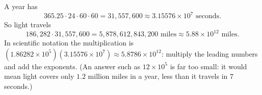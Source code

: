 A year has
\[
365.25\cdot24\cdot60\cdot60=31{,}557{,}600\approx3.15576\times10^{7}\text{ seconds}.
\]
So light travels
\[
186{,}282\cdot31{,}557{,}600=5{,}878{,}612{,}843{,}200\text{ miles}\approx\boxed{5.88\times10^{12}\text{ miles}}.
\]
In scientific notation the multiplication is $(1.86282\times10^5)(3.15576\times10^7)\approx5.8786\times10^{12}$: multiply the leading numbers and add the exponents. (An answer such as $12\times10^5$ is far too small: it would mean light covers only $1.2$ million miles in a year, less than it travels in $7$ seconds.)
